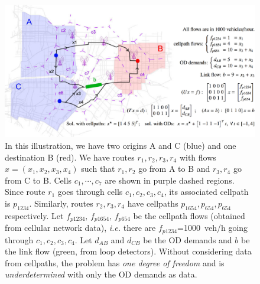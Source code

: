 \begin{figure}[h!]
  \centering
    \includegraphics[width=0.47	\textwidth]{figures/setup}
  \caption{\footnotesize{In this illustration, we have two origins A and C ({\color{blue}blue}) and one destination B ({\color{red}red}). We have routes $r_1,r_2,r_3,r_4$ with flows $x=(x_1,x_2,x_3, x_4)$ such that $r_1,r_2$ go from A to B and $r_3,r_4$ go from C to B. Cells $c_1,\cdots,c_7$ are shown in {\color{magenta} purple} dashed regions. Since route $r_1$ goes through cells $c_1,c_2,c_3,c_4$, its associated cellpath is $p_{1234}$. Similarly, routes $r_2,r_3,r_4$ have cellpaths $p_{1654},p_{654},p_{654}$ respectively. Let $f_{p1234},\,f_{p1654},\,f_{p654}$ be the cellpath flows (obtained from cellular network data), \emph{i.e.} there are $f_{p1234}$=1000~veh/h going through $c_1,c_2,c_3,c_4$. Let $d_{AB}$ and $d_{CB}$ be the OD demands and $b$ be the link flow ({\color{green}green}, from loop detectors). Without considering data from cellpaths, the problem has \emph{one degree of freedom} and is \emph{underdetermined} with only the OD demands as data.}}
  \label{fig:example-setup}
\end{figure}
